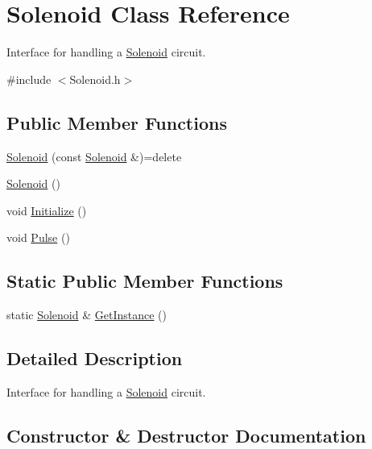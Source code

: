 \hypertarget{class_solenoid}{}\section{Solenoid Class Reference}
\label{class_solenoid}


Interface for handling a \hyperlink{class_solenoid}{Solenoid} circuit.  




{\ttfamily \#include $<$Solenoid.\+h$>$}

\subsection*{Public Member Functions}
\begin{DoxyCompactItemize}
\item 
\hyperlink{class_solenoid_a6e9f8ce2b5b09ea3f587b83dc7c7ee36}{Solenoid} (const \hyperlink{class_solenoid}{Solenoid} \&)=delete
\item 
\hyperlink{class_solenoid_a786f920a2fdb2136f19ea02cbdc53555}{Solenoid} ()
\item 
void \hyperlink{class_solenoid_a6093fb381f87eee3e22c6dfc97f3fdc0}{Initialize} ()
\item 
void \hyperlink{class_solenoid_a50bc0121679bd1ff11323f1c88fe2ec6}{Pulse} ()
\end{DoxyCompactItemize}
\subsection*{Static Public Member Functions}
\begin{DoxyCompactItemize}
\item 
static \hyperlink{class_solenoid}{Solenoid} \& \hyperlink{class_solenoid_adc5bf799e0eb382eb6a5e4d471308f20}{Get\+Instance} ()
\end{DoxyCompactItemize}


\subsection{Detailed Description}
Interface for handling a \hyperlink{class_solenoid}{Solenoid} circuit. 

\subsection{Constructor \& Destructor Documentation}
\hypertarget{class_solenoid_a6e9f8ce2b5b09ea3f587b83dc7c7ee36}{}\label{class_solenoid_a6e9f8ce2b5b09ea3f587b83dc7c7ee36} 
